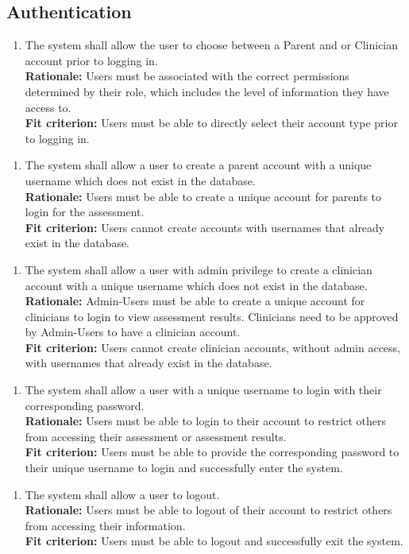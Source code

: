 \documentclass[12pt]{article}
\begin{document}
\subsection{Authentication}
\begin{enumerate}[label={FR-A}1. ]
  \item The system shall allow the user to choose between a Parent and  or Clinician account prior to logging in.\\
  \textbf{Rationale: }Users must be associated with the correct permissions determined by their role, which includes the level of information they have access to.\\
  \textbf{Fit criterion: }Users must be able to directly select their account type prior to logging in. 
\end{enumerate}
\begin{enumerate}[label={FR-A}2. ]
  \item The system shall allow a user to create a parent account with a unique username which does not exist in the database.\\
  \textbf{Rationale: }Users must be able to create a unique account for parents to login for the assessment.\\
  \textbf{Fit criterion: }Users cannot create accounts with usernames that already exist in the database.
\end{enumerate}
\begin{enumerate}[label={FR-A}3. ]
  \item The system shall allow a user with admin privilege to create a clinician account with a unique username which does not exist in the database.\\
  \textbf{Rationale: }Admin-Users must be able to create a unique account for clinicians to login to view assessment results. Clinicians need to be approved by Admin-Users to have a clinician account.\\
  \textbf{Fit criterion: }Users cannot create clinician accounts, without admin access, with usernames that already exist in the database. 
\end{enumerate}
\begin{enumerate}[label={FR-A}4. ]
  \item The system shall allow a user with a unique username to login with their corresponding password.\\
  \textbf{Rationale: }Users must be able to login to their account to restrict others from accessing their assessment or assessment results.\\
  \textbf{Fit criterion: }Users must be able to provide the corresponding password to their unique username to login and successfully enter the system. 
\end{enumerate}
\begin{enumerate}[label={FR-A}5. ]
  \item The system shall allow a user to logout.\\
  \textbf{Rationale: }Users must be able to logout of their account to restrict others from accessing their information.\\
  \textbf{Fit criterion: }Users must be able to logout and successfully exit the system.
\end{enumerate}
\end{document}
